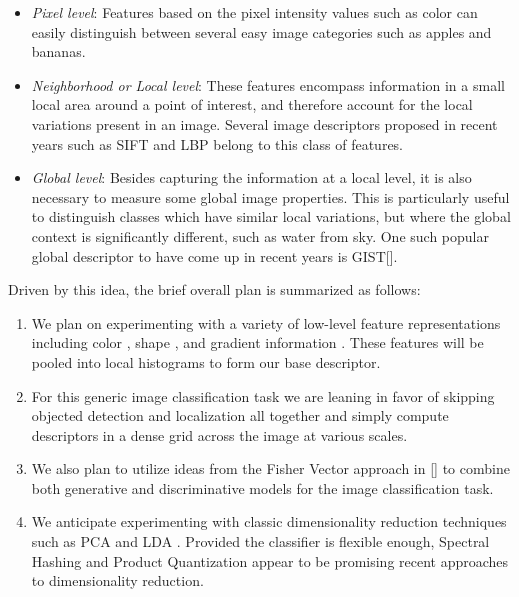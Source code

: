 \documentclass[12pt]{article}
\begin{document}
\begin{itemize}
\item \textit{Pixel level}: Features based on the pixel intensity values such as color can easily distinguish between several easy image categories such as apples and bananas.

\item \textit{Neighborhood or Local level}: These features encompass information in a small local area around a point of interest, and therefore account for the local variations present in an image. Several image descriptors proposed in recent years such as SIFT \cite{lowe04} and LBP \cite{ahonen06} belong to this class of features.

\item \textit{Global level}: Besides capturing the information at a local level, it is also necessary to measure some global image properties. This is particularly useful to distinguish classes which have similar local variations, but where the global context is significantly different, such as water from sky. One such popular global descriptor to have come up in recent years is 
GIST[].
\end{itemize}

Driven by this idea, the brief overall plan is summarized as follows: 

\begin{enumerate}

\item We plan on experimenting with a variety of low-level feature representations including color \cite{sande10}, shape \cite{ahonen06}, and gradient information \cite{lowe04,dalal05}. These features will be pooled into local histograms to form our base descriptor.

\item For this generic image classification task we are leaning in favor of skipping objected detection and localization all together and simply compute descriptors in a dense grid across the image at various scales.

\item  We also plan to utilize ideas from the Fisher Vector approach in [] to combine both generative and discriminative models for the image classification task.

\item We anticipate experimenting with classic dimensionality reduction techniques such as PCA \cite{turk91} and LDA \cite{belhumeur97}. Provided the classifier is flexible enough, Spectral Hashing \cite{weiss2008} and Product Quantization \cite{jegou2011} appear to be promising recent approaches to dimensionality reduction.



\end{enumerate}



\end{document}
